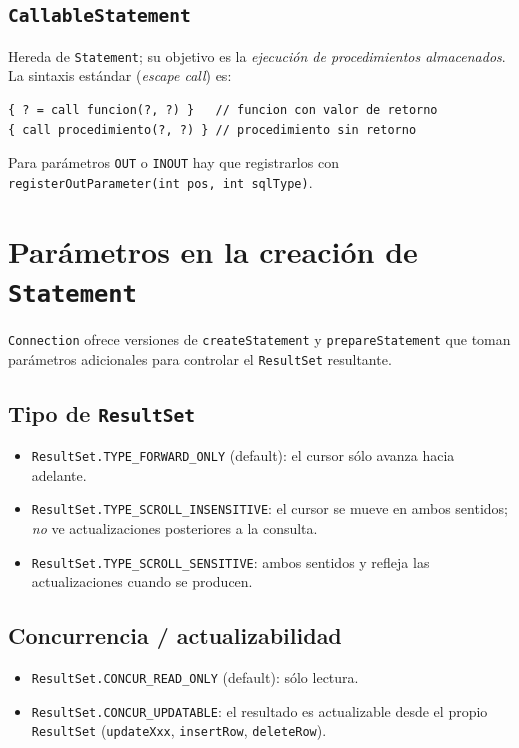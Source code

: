 \documentclass[11pt,a4paper]{article}
\begin{document}
\subsection*{\texttt{CallableStatement}}

Hereda de \texttt{Statement}; su objetivo es la \emph{ejecución de
procedimientos almacenados}. La sintaxis estándar (\emph{escape
call}) es:

\begin{lstlisting}
{ ? = call funcion(?, ?) }   // funcion con valor de retorno
{ call procedimiento(?, ?) } // procedimiento sin retorno
\end{lstlisting}

Para parámetros \texttt{OUT} o \texttt{INOUT} hay que registrarlos
con \texttt{registerOutParameter(int pos, int sqlType)}.

\section{Parámetros en la creación de \texttt{Statement}}

\texttt{Connection} ofrece versiones de \texttt{createStatement} y
\texttt{prepareStatement} que toman parámetros adicionales para
controlar el \texttt{ResultSet} resultante.

\subsection*{Tipo de \texttt{ResultSet}}

\begin{itemize}
    \item \texttt{ResultSet.TYPE\_FORWARD\_ONLY} (default): el cursor
    sólo avanza hacia adelante.
    \item \texttt{ResultSet.TYPE\_SCROLL\_INSENSITIVE}: el cursor se
    mueve en ambos sentidos; \emph{no} ve actualizaciones posteriores
    a la consulta.
    \item \texttt{ResultSet.TYPE\_SCROLL\_SENSITIVE}: ambos sentidos
    y refleja las actualizaciones cuando se producen.
\end{itemize}

\subsection*{Concurrencia / actualizabilidad}

\begin{itemize}
    \item \texttt{ResultSet.CONCUR\_READ\_ONLY} (default): sólo
    lectura.
    \item \texttt{ResultSet.CONCUR\_UPDATABLE}: el resultado es
    actualizable desde el propio \texttt{ResultSet}
    (\texttt{updateXxx}, \texttt{insertRow}, \texttt{deleteRow}).
\end{itemize}
\end{document}
